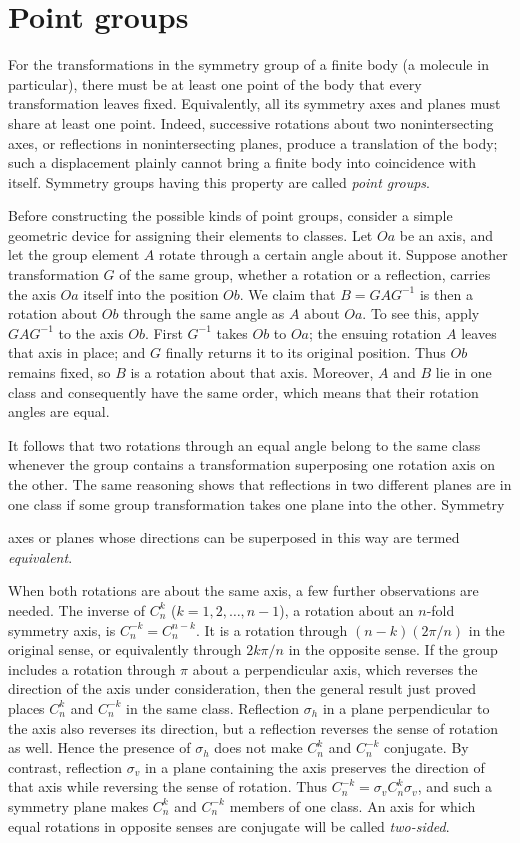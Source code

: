 \section{Point groups}

For the transformations in the symmetry group of a finite body (a molecule in particular), there must be at least one point of the body that every transformation leaves fixed. Equivalently, all its symmetry axes and planes must share at least one point. Indeed, successive rotations about two nonintersecting axes, or reflections in nonintersecting planes, produce a translation of the body; such a displacement plainly cannot bring a finite body into coincidence with itself. Symmetry groups having this property are called \emph{point groups}.

Before constructing the possible kinds of point groups, consider a simple geometric device for assigning their elements to classes. Let $Oa$ be an axis, and let the group element $A$ rotate through a certain angle about it. Suppose another transformation $G$ of the same group, whether a rotation or a reflection, carries the axis $Oa$ itself into the position $Ob$. We claim that $B=GAG^{-1}$ is then a rotation about $Ob$ through the same angle as $A$ about $Oa$. To see this, apply $GAG^{-1}$ to the axis $Ob$. First $G^{-1}$ takes $Ob$ to $Oa$; the ensuing rotation $A$ leaves that axis in place; and $G$ finally returns it to its original position. Thus $Ob$ remains fixed, so $B$ is a rotation about that axis. Moreover, $A$ and $B$ lie in one class and consequently have the same order, which means that their rotation angles are equal.

It follows that two rotations through an equal angle belong to the same class whenever the group contains a transformation superposing one rotation axis on the other. The same reasoning shows that reflections in two different planes are in one class if some group transformation takes one plane into the other. Symmetry

axes or planes whose directions can be superposed in this way are termed \emph{equivalent}.

When both rotations are about the same axis, a few further observations are needed. The inverse of $C_n^k$ ($k=1,2,\ldots,n-1$), a rotation about an $n$-fold symmetry axis, is $C_n^{-k}=C_n^{n-k}$. It is a rotation through $(n-k)(2\pi/n)$ in the original sense, or equivalently through $2k\pi/n$ in the opposite sense. If the group includes a rotation through $\pi$ about a perpendicular axis, which reverses the direction of the axis under consideration, then the general result just proved places $C_n^k$ and $C_n^{-k}$ in the same class. Reflection $\sigma_h$ in a plane perpendicular to the axis also reverses its direction, but a reflection reverses the sense of rotation as well. Hence the presence of $\sigma_h$ does not make $C_n^k$ and $C_n^{-k}$ conjugate. By contrast, reflection $\sigma_v$ in a plane containing the axis preserves the direction of that axis while reversing the sense of rotation. Thus $C_n^{-k}=\sigma_vC_n^k\sigma_v$, and such a symmetry plane makes $C_n^k$ and $C_n^{-k}$ members of one class. An axis for which equal rotations in opposite senses are conjugate will be called \emph{two-sided}.

